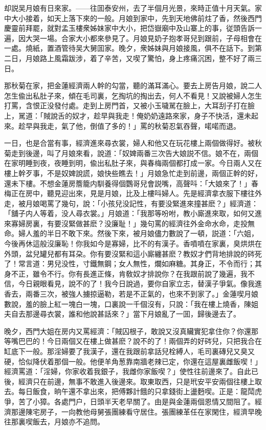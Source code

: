 却説吴月娘有日來家。——往囬泰安州，去了半個月光景，來時正值十月天氣。家中大小接着，如天上落下來的一般。月娘到家中，先到天地佛前炷了香，然後西門慶靈前拜罷，就對孟玉樓衆姊妹家中大小，把岱嶽廟中及山寨上的事，従頭告訴一遍，因大哭一場。合家大小都來參見了。月娘見奶子抱孝哥兒到跟前，子母相會在一處。燒紙，置酒管待吴大舅囬家。晚夕，衆姊妹與月娘接風，俱不在話下。到第二日，月娘路上風霜跋涉，着了辛苦，又喫了驚怕，身上疼痛沉困，整不好了兩三日。

那秋菊在家，把金蓮經濟兩人幹的勾當，聽的滿耳滿心。要去上房告月娘，說二人怎生偸出私肚子來，傾在毛司裏，乞掏坑的掏出去，何人不看見！又說被婦人怎生打罵，含恨正没發付處。走到上房門首，又被小玉噦駡在臉上，大耳刮子打在臉上，駡道：「賊說舌的奴才，趁早與我走！俺奶奶遠路來家，身子不快活，還未起來。趁早與我走，氣了他，倒值了多的！」罵的秋菊忍氣吞聲，喏喏而退。

一日，也是合當有事，經濟進來尋衣裳，婦人和他又在玩花樓上兩個做得好。被秋菊走到後邊，叫了月娘來看，說道：「奴婢兩番三次告大娘説不信。娘不在，兩個在家明睡到夜，夜睡到明，偸出私肚子來，與春梅兩個都打成一家。今日兩人又在樓上幹歹事，不是奴婢說謊，娘快些瞧去！」月娘急忙走到前邊，兩個正幹的好，還未下樓。不想金蓮房簷籠内馴養得個鸚哥兒會説嘴，高聲呌：「大娘來了！」春梅正在房中，聽見迎出來，見是月娘，比及上樓呌婦人。先是經濟拿衣服下樓往外走，被月娘喝罵了幾句，說：「小孩兒没記性，有要没緊進來撞甚麽？」經濟道：「舖子内人等着，没人尋衣裳。」月娘道：「我那等吩咐，教小廝進來取，如何又進來寡婦房裏，有要沒緊做甚麽？没廉耻！」幾句罵的經濟往外金命水命，走投無命。婦人羞的半日不敢下來。然後下來，被月娘儘力數說了一頓，説道：「六姐，今後再休這般沒廉恥！你我如今是寡婦，比不的有漢子。香噴噴在家裏，臭烘烘在外頭，盆兒罐兒都有耳朶。你有要沒緊和這小廝纏甚麽？教奴才們背地排說的硶死了！常言道：男兒没性，寸鐵無鋼；女人無性，爛如麻糖。其身正，不令而行；其身不正，雖令不行。你有長進正條，肯敎奴才排說你？在我跟前說了幾遍，我不信，今日親眼看見，說不的了！我今日說過，要你自家立志，替漢子爭氣。像我進香去，兩番三次，被強人擄掠逼勒，若是不正氣的，也來不到家了。」金蓮喫月娘數說，羞的臉上紅一塊白一塊，口裏說一千個沒有，只說：「我在樓上燒香，陳姐夫自去那邊尋衣裳，誰和他說甚話來？」當下月娘亂了一囬，歸後邊去了。

晚夕，西門大姐在房内又罵經濟：「賊囚根子，敢說又沒真贜實犯拿住你？你還那等嘴巴巴的！今日兩個又在樓上做甚麽？說不的了！兩個弄的好硶兒，只把我合在缸底下一般。那淫婦要了我漢子，還在我跟前拿話兒栓縛人，毛司裏磚兒又臭又硬，恰似降伏着那個一般。他便羊角葱靠南牆老辣已定，你還在這屋裏雌飯喫！」經濟罵道：「淫婦，你家收着我銀子，我雌你家飯喫？」使性往前邊來了。自此已後，經濟只在前邊，無事不敢進入後邊來。取東取西，只是玳安平安兩個往樓上取去。每日飯食，晌午還不拿出來，把傅夥計餓的只拿錢街上盪麪喫。正是：龍鬦虎爭，苦了小獐。各處門户，日頭半天老早關了。由是與金蓮兩個恩情又間阻了。經濟那邊陳宅房子，一向教他母舅張團練看守居住。張團練革任在家閑住，經濟早晚往那裏喫飯去，月娘亦不追問。

